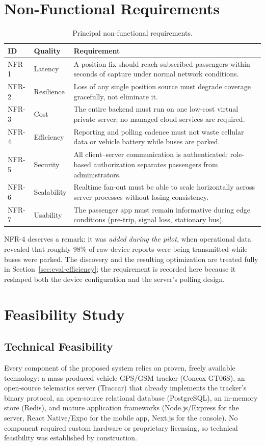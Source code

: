\section{Non-Functional Requirements}
\begin{table}[H]
\caption{Principal non-functional requirements.}
\label{tab:nfreq}
\centering
\small
\begin{tabular}{@{}llp{9.2cm}@{}}
\toprule
\textbf{ID} & \textbf{Quality} & \textbf{Requirement} \\
\midrule
NFR-1 & Latency & A position fix should reach subscribed passengers
within seconds of capture under normal network conditions. \\
NFR-2 & Resilience & Loss of any single position source must degrade
coverage gracefully, not eliminate it. \\
NFR-3 & Cost & The entire backend must run on one low-cost virtual
private server; no managed cloud services are required. \\
NFR-4 & Efficiency & Reporting and polling cadence must not waste
cellular data or vehicle battery while buses are parked. \\
NFR-5 & Security & All client--server communication is authenticated;
role-based authorization separates passengers from administrators. \\
NFR-6 & Scalability & Realtime fan-out must be able to scale
horizontally across server processes without losing consistency. \\
NFR-7 & Usability & The passenger app must remain informative during
edge conditions (pre-trip, signal loss, stationary bus). \\
\bottomrule
\end{tabular}
\end{table}

NFR-4 deserves a remark: it was \emph{added during the pilot}, when
operational data revealed that roughly 98\% of raw device reports were
being transmitted while buses were parked. The discovery and the
resulting optimization are treated fully in
Section~\ref{sec:eval-efficiency}; the requirement is recorded here
because it reshaped both the device configuration and the server's
polling design.

\section{Feasibility Study}

\subsection{Technical Feasibility}
Every component of the proposed system relies on proven, freely available
technology: a mass-produced vehicle GPS/GSM tracker (Concox GT06S), an
open-source telematics server (Traccar) that already implements the
tracker's binary protocol, an open-source relational database
(PostgreSQL), an in-memory store (Redis), and mature application
frameworks (Node.js/Express for the server, React Native/Expo for the
mobile app, Next.js for the console). No component required custom
hardware or proprietary licensing, so technical feasibility was
established by construction.

